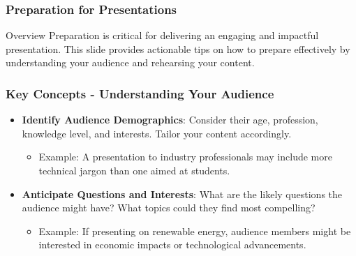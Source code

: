 \documentclass[aspectratio=169]{beamer}
\begin{document}
\begin{frame}[fragile]
    \frametitle{Preparation for Presentations}
    \begin{block}{Overview}
        Preparation is critical for delivering an engaging and impactful presentation. 
        This slide provides actionable tips on how to prepare effectively by understanding your audience and rehearsing your content.
    \end{block}
\end{frame}

\begin{frame}[fragile]
    \frametitle{Key Concepts - Understanding Your Audience}
    \begin{itemize}
        \item \textbf{Identify Audience Demographics}: 
        Consider their age, profession, knowledge level, and interests. Tailor your content accordingly.
        \begin{itemize}
            \item Example: A presentation to industry professionals may include more technical jargon than one aimed at students.
        \end{itemize}
        
        \item \textbf{Anticipate Questions and Interests}: 
        What are the likely questions the audience might have? What topics could they find most compelling?
        \begin{itemize}
            \item Example: If presenting on renewable energy, audience members might be interested in economic impacts or technological advancements.
        \end{itemize}
    \end{itemize}
\end{frame}
\end{document}
